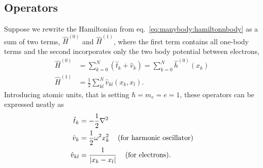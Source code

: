 \subsection{Operators}
\label{sec:manybody:operators}
Suppose we rewrite the Hamiltonian from eq.~\eqref{eq:manybody:hamiltonnbody} as a sum of two terms, $\hat{H}^{(0)}$ and $\hat{H}^{(1)}$, where the first term contains all one-body terms and the second incorporates only the two body potential between electrons,
\begin{equation}
\begin{split}
\hat{H}^{(0)} &= \sum_{k=0}^N \left( \hat{t}_k + \hat{v}_k \right)
= \sum_{k=0}^N \hat{h}^{(0)}(x_k)
\\
\hat{H}^{(1)} &= \frac{1}{2} \sum_{kl}^N \hat{v}_{kl} (x_k, x_l) .
\end{split}
\end{equation}
Introducing atomic units, that is setting $\hbar = m_{e} = e = 1$, these operators can be expressed neatly as
\begin{equation}
\begin{split}
\hat{t}_k &= - \frac{1}{2} \nabla^2 \\ 
\hat{v}_{k} &= \frac{1}{2} \omega^2 x_k^2 \hspace{3mm}\textrm{ (for harmonic oscillator)} \\
\hat{v}_{kl} &= \frac{1}{|x_k - x_l|} \hspace{3mm}\textrm{ (for electrons)} .
\end{split}
\end{equation}


